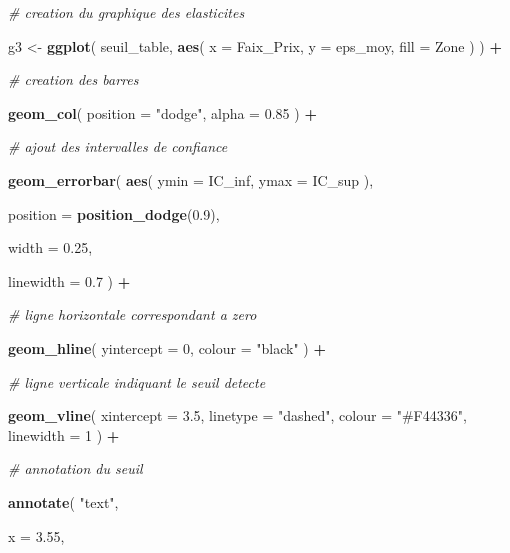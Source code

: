 \documentclass[
]{article}
\newenvironment{Shaded}{\begin{snugshade}}{\end{snugshade}}
\newcommand{\AttributeTok}[1]{\textcolor[rgb]{0.13,0.29,0.53}{#1}}
\newcommand{\CommentTok}[1]{\textcolor[rgb]{0.56,0.35,0.01}{\textit{#1}}}
\newcommand{\DecValTok}[1]{\textcolor[rgb]{0.00,0.00,0.81}{#1}}
\newcommand{\FloatTok}[1]{\textcolor[rgb]{0.00,0.00,0.81}{#1}}
\newcommand{\FunctionTok}[1]{\textcolor[rgb]{0.13,0.29,0.53}{\textbf{#1}}}
\newcommand{\NormalTok}[1]{#1}
\newcommand{\OtherTok}[1]{\textcolor[rgb]{0.56,0.35,0.01}{#1}}
\newcommand{\SpecialCharTok}[1]{\textcolor[rgb]{0.81,0.36,0.00}{\textbf{#1}}}
\newcommand{\StringTok}[1]{\textcolor[rgb]{0.31,0.60,0.02}{#1}}
\begin{document}
\begin{Shaded}
\begin{Highlighting}[]
\CommentTok{\# creation du graphique des elasticites}

\NormalTok{g3 }\OtherTok{\textless{}{-}} \FunctionTok{ggplot}\NormalTok{(}
\NormalTok{  seuil\_table,}
  \FunctionTok{aes}\NormalTok{(}
    \AttributeTok{x =}\NormalTok{ Faix\_Prix,}
    \AttributeTok{y =}\NormalTok{ eps\_moy,}
    \AttributeTok{fill =}\NormalTok{ Zone}
\NormalTok{  )}
\NormalTok{) }\SpecialCharTok{+}

  \CommentTok{\# creation des barres}

  \FunctionTok{geom\_col}\NormalTok{(}
    \AttributeTok{position =} \StringTok{"dodge"}\NormalTok{,}
    \AttributeTok{alpha =} \FloatTok{0.85}
\NormalTok{  ) }\SpecialCharTok{+}

  \CommentTok{\# ajout des intervalles de confiance}

  \FunctionTok{geom\_errorbar}\NormalTok{(}
    \FunctionTok{aes}\NormalTok{(}
      \AttributeTok{ymin =}\NormalTok{ IC\_inf,}
      \AttributeTok{ymax =}\NormalTok{ IC\_sup}
\NormalTok{    ),}

    \AttributeTok{position =} \FunctionTok{position\_dodge}\NormalTok{(}\FloatTok{0.9}\NormalTok{),}

    \AttributeTok{width =} \FloatTok{0.25}\NormalTok{,}

    \AttributeTok{linewidth =} \FloatTok{0.7}
\NormalTok{  ) }\SpecialCharTok{+}

  \CommentTok{\# ligne horizontale correspondant a zero}

  \FunctionTok{geom\_hline}\NormalTok{(}
    \AttributeTok{yintercept =} \DecValTok{0}\NormalTok{,}
    \AttributeTok{colour =} \StringTok{"black"}
\NormalTok{  ) }\SpecialCharTok{+}

  \CommentTok{\# ligne verticale indiquant le seuil detecte}

  \FunctionTok{geom\_vline}\NormalTok{(}
    \AttributeTok{xintercept =} \FloatTok{3.5}\NormalTok{,}
    \AttributeTok{linetype =} \StringTok{"dashed"}\NormalTok{,}
    \AttributeTok{colour =} \StringTok{"\#F44336"}\NormalTok{,}
    \AttributeTok{linewidth =} \DecValTok{1}
\NormalTok{  ) }\SpecialCharTok{+}

  \CommentTok{\# annotation du seuil}

  \FunctionTok{annotate}\NormalTok{(}
    \StringTok{"text"}\NormalTok{,}

    \AttributeTok{x =} \FloatTok{3.55}\NormalTok{,}


\end{Highlighting}
\end{Shaded}
\end{document}
